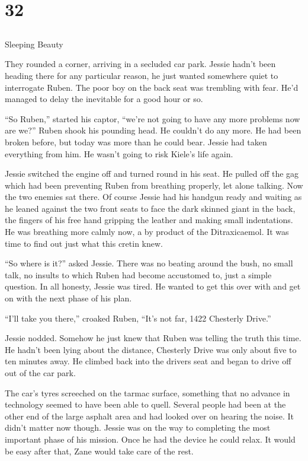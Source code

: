 \chapter{32}
\section{}
Sleeping Beauty  

They rounded a corner, arriving in a secluded car park.  Jessie hadn't been heading there for any particular reason, he just wanted somewhere quiet to interrogate Ruben.  The poor boy on the back seat was trembling with fear.  He'd managed to delay the inevitable for a good hour or so.

``So Ruben,'' started his captor, ``we're not going to have any more problems now are we?''  Ruben shook his pounding head.  He couldn't do any more.  He had been broken before, but today was more than he could bear.  Jessie had taken everything from him.  He wasn't going to risk Kiele's life again.

Jessie switched the engine off and turned round in his seat.  He pulled off the gag which had been preventing Ruben from breathing properly, let alone talking.  Now the two enemies sat there.  Of course Jessie had his handgun ready and waiting as he leaned against the two front seats to face the dark skinned giant in the back, the fingers of his free hand gripping the leather and making small indentations.  He was breathing more calmly now, a by product of the Ditraxicaemol.  It was time to find out just what this cretin knew.

``So where is it?'' asked Jessie.  There was no beating around the bush, no small talk, no insults to which Ruben had become accustomed to, just a simple question.  In all honesty, Jessie was tired.  He wanted to get this over with and get on with the next phase of his plan.

``I'll take you there,'' croaked Ruben, ``It's not far, 1422 Chesterly Drive.''

Jessie nodded.  Somehow he just knew that Ruben was telling the truth this time.  He hadn't been lying about the distance, Chesterly Drive was only about five to ten minutes away.  He climbed back into the drivers seat and began to drive off out of the car park.

The car's tyres screeched on the tarmac surface, something that no advance in technology seemed to have been able to quell.  Several people had been at the other end of the large asphalt area and had looked over on hearing the noise.  It didn't matter now though.  Jessie was on the way to completing the most important phase of his mission.  Once he had the device he could relax.  It would be easy after that, Zane would take care of the rest.  

